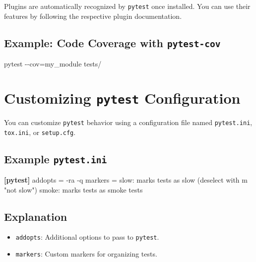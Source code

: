 \documentclass[
  letterpaper,
  DIV=11,
  numbers=noendperiod]{scrreprt}
\newenvironment{Shaded}{\begin{snugshade}}{\end{snugshade}}
\newcommand{\AttributeTok}[1]{\textcolor[rgb]{0.40,0.45,0.13}{#1}}
\newcommand{\DataTypeTok}[1]{\textcolor[rgb]{0.68,0.00,0.00}{#1}}
\newcommand{\ExtensionTok}[1]{\textcolor[rgb]{0.00,0.23,0.31}{#1}}
\newcommand{\KeywordTok}[1]{\textcolor[rgb]{0.00,0.23,0.31}{\textbf{#1}}}
\newcommand{\NormalTok}[1]{\textcolor[rgb]{0.00,0.23,0.31}{#1}}
\newcommand{\OperatorTok}[1]{\textcolor[rgb]{0.37,0.37,0.37}{#1}}
\newcommand{\OtherTok}[1]{\textcolor[rgb]{0.00,0.23,0.31}{#1}}
\newcommand{\StringTok}[1]{\textcolor[rgb]{0.13,0.47,0.30}{#1}}
\providecommand{\tightlist}{%
  \setlength{\itemsep}{0pt}\setlength{\parskip}{0pt}}\usepackage{longtable,booktabs,array}
\begin{document}
Plugins are automatically recognized by \texttt{pytest} once installed.
You can use their features by following the respective plugin
documentation.

\subsection{\texorpdfstring{Example: Code Coverage with
\texttt{pytest-cov}}{Example: Code Coverage with pytest-cov}}\label{example-code-coverage-with-pytest-cov}

\begin{Shaded}
\begin{Highlighting}[]
\ExtensionTok{pytest} \AttributeTok{{-}{-}cov}\OperatorTok{=}\NormalTok{my\_module tests/}
\end{Highlighting}
\end{Shaded}

\section{\texorpdfstring{Customizing \texttt{pytest}
Configuration}{Customizing pytest Configuration}}\label{customizing-pytest-configuration}

You can customize \texttt{pytest} behavior using a configuration file
named \texttt{pytest.ini}, \texttt{tox.ini}, or \texttt{setup.cfg}.

\subsection{\texorpdfstring{Example
\texttt{pytest.ini}}{Example pytest.ini}}\label{example-pytest.ini}

\begin{Shaded}
\begin{Highlighting}[]
\KeywordTok{[pytest]}
\DataTypeTok{addopts }\OtherTok{=}\StringTok{ {-}ra {-}q}
\DataTypeTok{markers }\OtherTok{=}
\DataTypeTok{    slow: marks tests as slow (deselect with \textquotesingle{}{-}m "not slow"\textquotesingle{})}
\DataTypeTok{    smoke: marks tests as smoke tests}
\end{Highlighting}
\end{Shaded}

\subsection{Explanation}\label{explanation-1}

\begin{itemize}
\tightlist
\item
  \texttt{addopts}: Additional options to pass to \texttt{pytest}.
\item
  \texttt{markers}: Custom markers for organizing tests.
\end{itemize}
\end{document}
